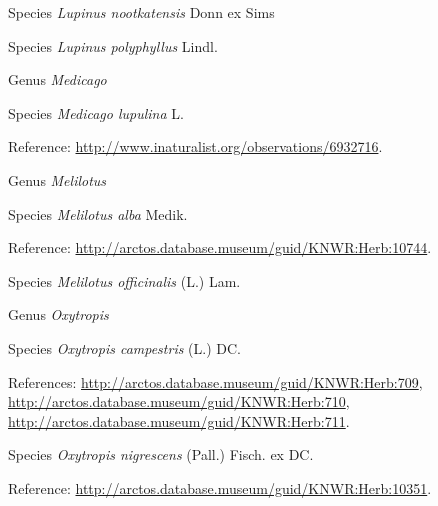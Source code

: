 \documentclass[9pt, article]{memoir}
\begin{document}
\begin{multicols}{2}
\vspace{6pt}\noindent\hspace{36pt}Species \textit{Lupinus nootkatensis} Donn ex Sims


\vspace{6pt}\noindent\hspace{36pt}Species \textit{Lupinus polyphyllus} Lindl.


\vspace{6pt}\noindent\hspace{30pt}Genus \textit{Medicago}


\vspace{6pt}\noindent\hspace{36pt}Species \textit{Medicago lupulina} L.


\vspace{6pt}Reference: 
\url{http://www.inaturalist.org/observations/6932716}.

\vspace{6pt}\noindent\hspace{30pt}Genus \textit{Melilotus}


\vspace{6pt}\noindent\hspace{36pt}Species \textit{Melilotus alba} Medik.


\vspace{6pt}Reference: 
\url{http://arctos.database.museum/guid/KNWR:Herb:10744}.

\vspace{6pt}\noindent\hspace{36pt}Species \textit{Melilotus officinalis} (L.) Lam.


\vspace{6pt}\noindent\hspace{30pt}Genus \textit{Oxytropis}


\vspace{6pt}\noindent\hspace{36pt}Species \textit{Oxytropis campestris} (L.) DC.


\vspace{6pt}References: 
\url{http://arctos.database.museum/guid/KNWR:Herb:709}, 
\url{http://arctos.database.museum/guid/KNWR:Herb:710}, 
\url{http://arctos.database.museum/guid/KNWR:Herb:711}.

\vspace{6pt}\noindent\hspace{36pt}Species \textit{Oxytropis nigrescens} (Pall.) Fisch. ex DC.


\vspace{6pt}Reference: 
\url{http://arctos.database.museum/guid/KNWR:Herb:10351}.


\end{multicols}
\end{document}
